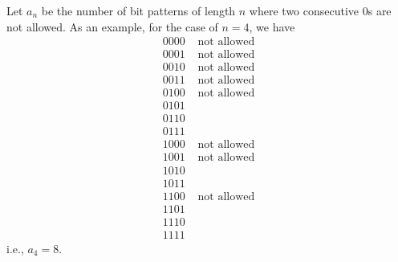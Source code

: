   Let $a_n$ be the number of bit patterns of length $n$ where
  two consecutive 0s are not allowed.
  As an example, for the case of $n = 4$, we have
  \begin{align*}
     0000 & \text{ not allowed} \\
     0001 & \text{ not allowed} \\
     0010 & \text{ not allowed} \\
     0011 & \text{ not allowed} \\
     0100 & \text{ not allowed} \\
     0101 & \text{ }\\
     0110 & \text{ }\\
     0111 & \text{ }\\
     1000 & \text{ not allowed} \\
     1001 & \text{ not allowed} \\
     1010 & \text{ }\\
     1011 & \text{ }\\
     1100 & \text{ not allowed} \\
     1101 & \text{ }\\
     1110 & \text{ }\\
     1111 & \text{ }
  \end{align*}
i.e., $a_4 = 8$.
